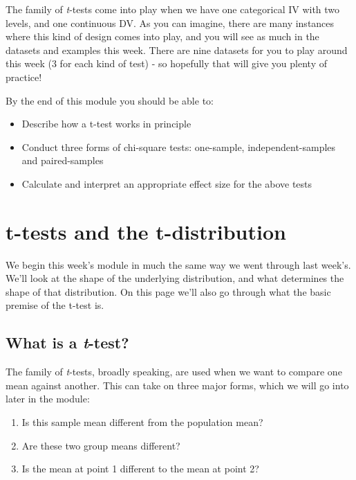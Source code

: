 \documentclass[
]{book}
\providecommand{\tightlist}{%
  \setlength{\itemsep}{0pt}\setlength{\parskip}{0pt}}
\begin{document}
The family of \emph{t}-tests come into play when we have one categorical IV with two levels, and one continuous DV. As you can imagine, there are many instances where this kind of design comes into play, and you will see as much in the datasets and examples this week. There are nine datasets for you to play around this week (3 for each kind of test) - so hopefully that will give you plenty of practice!

By the end of this module you should be able to:

\begin{itemize}
\tightlist
\item
  Describe how a t-test works in principle
\item
  Conduct three forms of chi-square tests: one-sample, independent-samples and paired-samples
\item
  Calculate and interpret an appropriate effect size for the above tests
\end{itemize}

\hypertarget{t-tests-and-the-t-distribution}{%
\section{t-tests and the t-distribution}\label{t-tests-and-the-t-distribution}}

We begin this week's module in much the same way we went through last week's. We'll look at the shape of the underlying distribution, and what determines the shape of that distribution. On this page we'll also go through what the basic premise of the t-test is.

\hypertarget{what-is-a-t-test}{%
\subsection{\texorpdfstring{What is a \emph{t}-test?}{What is a t-test?}}\label{what-is-a-t-test}}

The family of \emph{t}-tests, broadly speaking, are used when we want to compare one mean against another. This can take on three major forms, which we will go into later in the module:

\begin{enumerate}
\def\labelenumi{\arabic{enumi}.}
\tightlist
\item
  Is this sample mean different from the population mean?
\item
  Are these two group means different?
\item
  Is the mean at point 1 different to the mean at point 2?
\end{enumerate}
\end{document}
